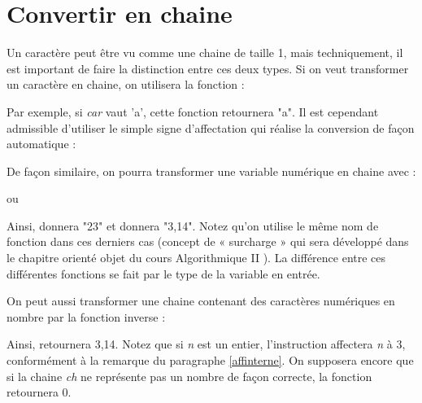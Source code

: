 \section{Convertir en chaine}

	Un caractère peut être vu comme une chaine de taille 1, 
	mais techniquement, 
	il est important de faire la distinction entre ces deux types. 
	Si on veut transformer un caractère en chaine, 
	on utilisera la fonction :

	\begin{center}
	\end{center}

	Par exemple, si \textit{car} vaut 'a', cette fonction retournera "a". 
	Il est cependant admissible d'utiliser le simple signe d'affectation 
	qui réalise la conversion de façon automatique :

	\begin{center}
	\end{center}

	De façon similaire, 
	on pourra transformer une variable numérique en chaine avec :

	\begin{center}
	\end{center}

	ou

	\begin{center}
	\end{center}

	Ainsi,  donnera "23" 
	et  donnera "3,14". 
	Notez qu'on utilise le même nom de fonction dans ces derniers cas 
	(concept de « surcharge » qui sera développé 
	dans le chapitre orienté objet du cours \og Algorithmique II \fg). 
	La différence entre ces différentes fonctions 
	se fait par le type de la variable en entrée.

	On peut aussi transformer une chaine 
	contenant des caractères numériques 
	en nombre par la fonction inverse :

	\begin{center}
	\end{center}

	Ainsi, 
	 retournera 3,14. 
	Notez que si \textit{n} est un entier, 
	l'instruction  affectera \textit{n} à 3, 
	conformément à la remarque du paragraphe \vref{affinterne}. 
	On supposera encore que si la chaine \textit{ch} ne représente pas 
	un nombre de façon correcte, la fonction retournera 0.

